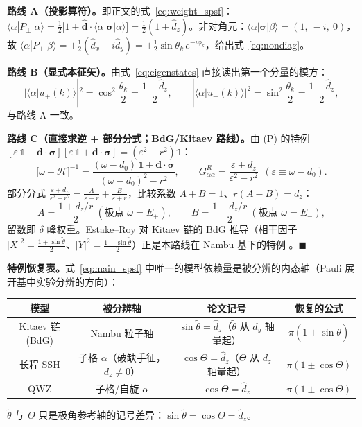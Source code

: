 \documentclass[onecolumn,aps,prl,superscriptaddress,longbibliography]{revtex4-2}
\begin{document}
\textbf{路线 A（投影算符）。}即正文的式~\eqref{eq:weight_spsf}：$\langle\alpha|P_\pm|\alpha\rangle = \frac{1}{2}\big[1 \pm \hat{\mathbf{d}}\cdot\langle\alpha|\symbf{\sigma}|\alpha\rangle\big] = \frac{1}{2}(1\pm\hat d_z)$。非对角元：$\langle\alpha|\symbf{\sigma}|\beta\rangle = (1,\ -i,\ 0)$，故 $\langle\alpha|P_\pm|\beta\rangle = \pm\frac{1}{2}(\hat d_x - i\hat d_y) = \pm\frac{1}{2}\sin\theta_k\,e^{-i\phi_k}$，给出式~\eqref{eq:nondiag}。

\textbf{路线 B（显式本征矢）。}由式~\eqref{eq:eigenstates} 直接读出第一个分量的模方：
$$|\langle\alpha|u_+(k)\rangle|^2 = \cos^2\frac{\theta_k}{2} = \frac{1+\hat d_z}{2},\qquad
|\langle\alpha|u_-(k)\rangle|^2 = \sin^2\frac{\theta_k}{2} = \frac{1-\hat d_z}{2},$$
与路线 A 一致。

\textbf{路线 C（直接求逆 + 部分分式；BdG/Kitaev 路线）。}由 (P) 的特例 $[\varepsilon\,\mathbb{1} - \mathbf{d}\cdot\symbf{\sigma}][\varepsilon\,\mathbb{1} + \mathbf{d}\cdot\symbf{\sigma}] = (\varepsilon^2 - r^2)\mathbb{1}$：
$$\big[\omega - \mathcal{H}\big]^{-1} = \frac{(\omega - d_0)\,\mathbb{1} + \mathbf{d}\cdot\symbf{\sigma}}{(\omega - d_0)^2 - r^2},\qquad
G^R_{\alpha\alpha} = \frac{\varepsilon + d_z}{\varepsilon^2 - r^2}\ \ (\varepsilon \equiv \omega - d_0).$$
部分分式 $\frac{\varepsilon + d_z}{\varepsilon^2 - r^2} = \frac{A}{\varepsilon - r} + \frac{B}{\varepsilon + r}$，比较系数 $A + B = 1$、$r(A - B) = d_z$：
$$A = \frac{1 + d_z/r}{2}\ (\text{极点 }\omega = E_+),\qquad B = \frac{1 - d_z/r}{2}\ (\text{极点 }\omega = E_-),$$
留数即 $\delta$ 峰权重。Estake--Roy 对 Kitaev 链的 BdG 推导（相干因子 $|X|^2 = \frac{1+\sin\tilde\theta}{2}$、$|Y|^2 = \frac{1-\sin\tilde\theta}{2}$）正是本路线在 Nambu 基下的特例 \cite{estakeRoy2025}。$\blacksquare$

\textbf{特例恢复表。}式~\eqref{eq:main_spsf} 中唯一的模型依赖量是被分辨的内态轴（Pauli 展开基中实验分辨的方向）：
\begin{center}
\renewcommand\arraystretch{1.4}
\begin{tabular}{c|ccc}
\hline
模型 & 被分辨轴 & 论文记号 & 恢复的公式 \\
\hline
Kitaev 链 (BdG) & Nambu 粒子轴 & $\sin\tilde\theta = \hat d_z$（$\tilde\theta$ 从 $d_y$ 轴量起） & $\pi(1\pm\sin\tilde\theta)$ \\
长程 SSH & 子格 $\alpha$（破缺手征，$d_z\neq0$） & $\cos\Theta = \hat d_z$（$\Theta$ 从 $d_z$ 轴量起） & $\pi(1\pm\cos\Theta)$ \\
QWZ & 子格/自旋 $\alpha$ & $\cos\Theta = \hat d_z$ & $\pi(1\pm\cos\Theta)$ \\
\hline
\end{tabular}
\end{center}
$\tilde\theta$ 与 $\Theta$ 只是极角参考轴的记号差异：$\sin\tilde\theta = \cos\Theta = \hat d_z$。
\end{document}
